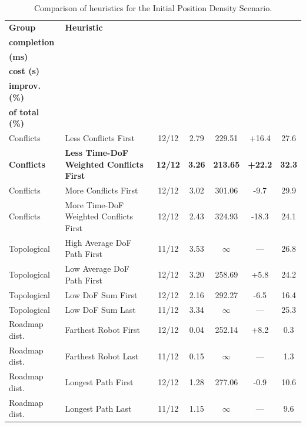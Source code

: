 \begin{table}[H]
\centering
\caption{Comparison of heuristics for the Initial Position Density Scenario.}
\label{tab:heuristics_initial_position_density}
\scriptsize
\setlength{\tabcolsep}{3pt}
\begin{tabular}{@{}llccccc@{}}
\toprule
\textbf{Group} &
\textbf{Heuristic} &
\makecell{\textbf{Robot}\\\textbf{completion}} &
\makecell{\textbf{t perm.}\\\textbf{(ms)}} &
\makecell{\textbf{Excess}\\\textbf{cost (s)}} &
\makecell{\textbf{Cost}\\\textbf{improv. (\%)}} &
\makecell{\textbf{Perm. time}\\\textbf{of total (\%)}} \\
\midrule

Conflicts & Less Conflicts First & 12/12 & 2.79 & 229.51 & +16.4 & 27.6 \\
\textbf{Conflicts} & \textbf{Less Time-DoF Weighted Conflicts First} & \textbf{12/12} & \textbf{3.26} & \textbf{213.65} & \textbf{+22.2} & \textbf{32.3} \\
Conflicts & More Conflicts First & 12/12 & 3.02 & 301.06 & -9.7 & 29.9 \\
Conflicts & More Time-DoF Weighted Conflicts First & 12/12 & 2.43 & 324.93 & -18.3 & 24.1 \\

\midrule

Topological & High Average DoF Path First & 11/12 & 3.53 & $\infty$ & --- & 26.8 \\
Topological & Low Average DoF Path First & 12/12 & 3.20 & 258.69 & +5.8 & 24.2 \\
Topological & Low DoF Sum First & 12/12 & 2.16 & 292.27 & -6.5 & 16.4 \\
Topological & Low DoF Sum Last & 11/12 & 3.34 & $\infty$ & --- & 25.3 \\

\midrule

Roadmap dist. & Farthest Robot First & 12/12 & 0.04 & 252.14 & +8.2 & 0.3 \\
Roadmap dist. & Farthest Robot Last & 11/12 & 0.15 & $\infty$ & --- & 1.3 \\
Roadmap dist. & Longest Path First & 12/12 & 1.28 & 277.06 & -0.9 & 10.6 \\
Roadmap dist. & Longest Path Last & 11/12 & 1.15 & $\infty$ & --- & 9.6 \\


\end{tabular}
\end{table}
